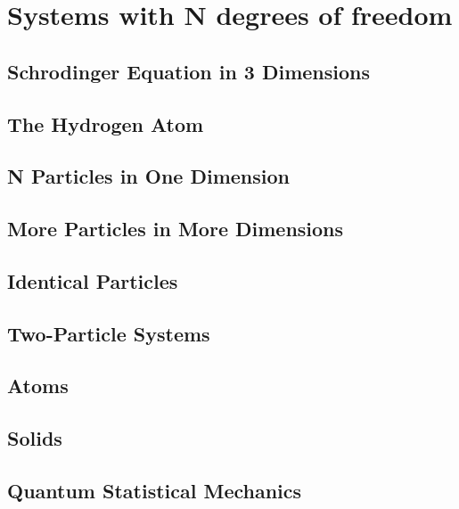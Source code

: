 \chapter{Systems with N degrees of freedom}
\section{Schrodinger Equation in 3 Dimensions}
\section{The Hydrogen Atom}
\section{N Particles in One Dimension}
\section{More Particles in More Dimensions}
\section{Identical Particles}
\section{Two-Particle Systems}
\section{Atoms}
\section{Solids}
\section{Quantum Statistical Mechanics}